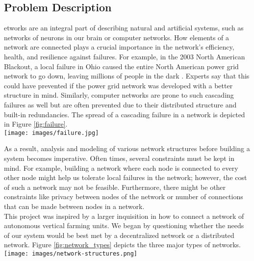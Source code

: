 \documentclass[journal]{IEEEtran}
\begin{document}
\subsection{Problem Description}
\lowercase{etworks} are an integral part of describing natural and artificial systems, such as networks of neurons in our brain or computer networks. How elements of a network are connected plays a crucial importance in the network's efficiency, health, and resilience against failures. For example, in the 2003 North American Blackout, a local failure in Ohio caused the entire North American power grid network to go down, leaving millions of people in the dark \cite[]{blackout}. Experts say that this could have prevented if the power grid network was developed with a better structure in mind. Similarly, computer networks are prone to such cascading failures as well but are often prevented due to their distributed structure and built-in redundancies. The spread of a cascading failure in a network is depicted in Figure \ref{fig:failure}. \\

\begingroup
    \centering
    \medskip
    \texttt{[image: images/failure.jpg]}
    \label{fig:failure}
    \medskip
\endgroup

\noindent As a result, analysis and modeling of various network structures before building a system becomes imperative. Often times, several constraints must be kept in mind. For example, building a network where each node is connected to every other node might help us tolerate local failures in the network; however, the cost of such a network may not be feasible. Furthermore, there might be other constraints like privacy between nodes of the network or number of connections that can be made between nodes in a network.\\

\noindent This project was inspired by a larger inquisition in how to connect a network of autonomous vertical farming units. We began by questioning whether the needs of our system would be best met by a decentralized network or a distributed network. Figure \ref{fig:network_types} depicts the three major types of networks. \\

\begingroup
    \centering
    \medskip
    \texttt{[image: images/network-structures.png]}
    \label{fig:network_types}
    \medskip
\endgroup
\end{document}
